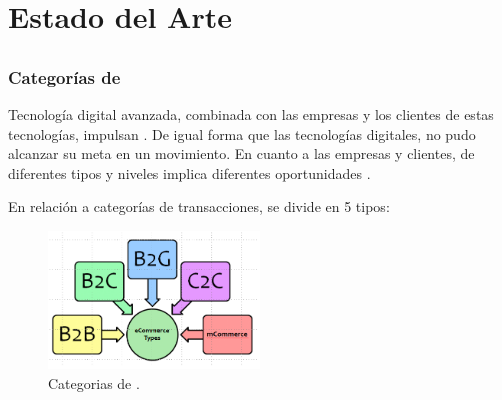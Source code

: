 \chapter{Estado del Arte}\label{cap:estadoArte}



%
%

\section{\ecommerce}

\subsection{Categorías de \ecommerce}

Tecnología digital avanzada, combinada con las empresas y los clientes de estas tecnologías, impulsan \ecommerce. De igual forma que las tecnologías digitales, \ecommerce no pudo alcanzar su meta en un movimiento. En cuanto a las empresas y clientes, \ecommerce de diferentes tipos y niveles implica diferentes oportunidades \cite{zheng2009fundamentals}.

En relación a categorías de transacciones, \ecommerce se divide en 5 tipos:
\begin{figure}[h!]
	\centering
	\includegraphics[width=0.5\textwidth]{figuras/ecommerce_types.png}
	\caption{Categorias de \ecommerce.}
\end{figure}

